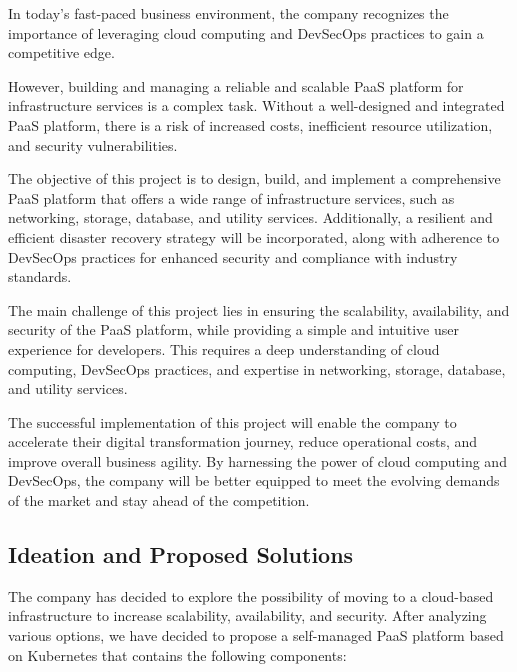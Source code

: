 \hspace{7mm}In today's fast-paced business environment, the company recognizes the importance of leveraging cloud computing and DevSecOps practices to gain a competitive edge. 

\hspace{7mm}However, building and managing a reliable and scalable PaaS platform for infrastructure services is a complex task. Without a well-designed and integrated PaaS platform, there is a risk of increased costs, inefficient resource utilization, and security vulnerabilities.

\hspace{7mm}The objective of this project is to design, build, and implement a comprehensive PaaS platform that offers a wide range of infrastructure services, such as networking, storage, database, and utility services. Additionally, a resilient and efficient disaster recovery strategy will be incorporated, along with adherence to DevSecOps practices for enhanced security and compliance with industry standards.

\hspace{7mm}The main challenge of this project lies in ensuring the scalability, availability, and security of the PaaS platform, while providing a simple and intuitive user experience for developers. This requires a deep understanding of cloud computing, DevSecOps practices, and expertise in networking, storage, database, and utility services.

\hspace{7mm}The successful implementation of this project will enable the company to accelerate their digital transformation journey, reduce operational costs, and improve overall business agility. By harnessing the power of cloud computing and DevSecOps, the company will be better equipped to meet the evolving demands of the market and stay ahead of the competition.

\subsection{Ideation and Proposed Solutions} 

\hspace{7mm}The company has decided to explore the possibility of moving to a cloud-based infrastructure to increase scalability, availability, and security. After analyzing various options, we have decided to propose a self-managed PaaS platform based on Kubernetes that contains the following components: 

